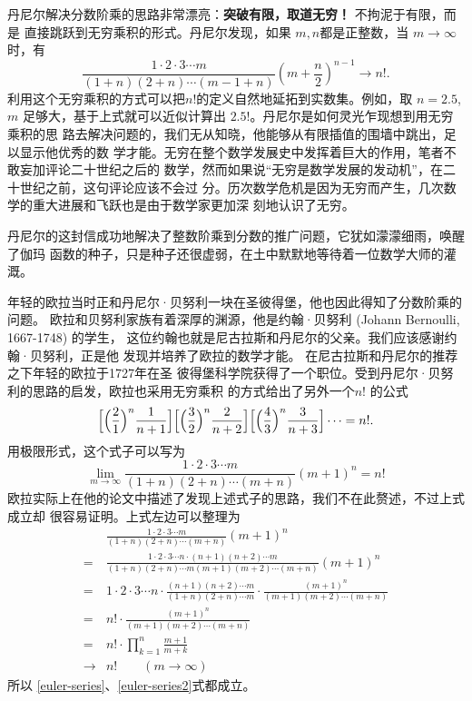 {丹尼尔解决分数阶乘的思路非常漂亮：{\bf 突破有限，取道无穷！} 不拘泥于有限，而是
直接跳跃到无穷乘积的形式。丹尼尔发现，如果 $m,n$都是正整数，当 $m
\rightarrow \infty$时，有
$$ \frac{1\cdot 2\cdot 3 \cdots m}{(1+n)(2+n)\cdots (m-1+n)}(m+\frac{n}{2})^{n-1} 
\rightarrow n! .$$
利用这个无穷乘积的方式可以把$n!$的定义自然地延拓到实数集。例如，取 $n=2.5$, $m$
足够大，基于上式就可以近似计算出 $2.5!$。丹尼尔是如何灵光乍现想到用无穷乘积的思
路去解决问题的，我们无从知晓，他能够从有限插值的围墙中跳出，足以显示他优秀的数
学才能。无穷在整个数学发展史中发挥着巨大的作用，笔者不敢妄加评论二十世纪之后的
数学，然而如果说“无穷是数学发展的发动机”，在二十世纪之前，这句评论应该不会过
分。历次数学危机是因为无穷而产生，几次数学的重大进展和飞跃也是由于数学家更加深
刻地认识了无穷。 

丹尼尔的这封信成功地解决了整数阶乘到分数的推广问题，它犹如濛濛细雨，唤醒了伽玛
函数的种子，只是种子还很虚弱，在土中默默地等待着一位数学大师的灌溉。

年轻的欧拉当时正和丹尼尔·贝努利一块在圣彼得堡，他也因此得知了分数阶乘的问题。
欧拉和贝努利家族有着深厚的渊源，他是约翰·贝努利 (Johann Bernoulli, 1667-1748)
的学生， 这位约翰也就是尼古拉斯和丹尼尔的父亲。我们应该感谢约翰·贝努利，正是他
发现并培养了欧拉的数学才能。 在尼古拉斯和丹尼尔的推荐之下年轻的欧拉于1727年在圣
彼得堡科学院获得了一个职位。受到丹尼尔·贝努利的思路的启发，欧拉也采用无穷乘积
的方式给出了另外一个$n!$ 的公式
\begin{equation}
\label{euler-series}
\Bigl[\Bigl(\frac{2}{1}\Bigr)^n\frac{1}{n+1}\Bigr]
\Bigl[\Bigl(\frac{3}{2}\Bigr)^n\frac{2}{n+2}\Bigr]
\Bigl[\Bigl(\frac{4}{3}\Bigr)^n\frac{3}{n+3}\Bigr] \cdots = n! .
\end{equation}
用极限形式，这个式子可以写为
\begin{equation}
\label{euler-series2}
\lim_{m \rightarrow \infty} \frac{1\cdot 2\cdot 3 \cdots m}{(1+n)(2+n)\cdots (m+n)}(m+1)^{n} = n!
\end{equation}
欧拉实际上在他的论文中描述了发现上述式子的思路，我们不在此赘述，不过上式成立却
很容易证明。上式左边可以整理为
\begin{align*}
& \frac{1\cdot 2\cdot 3 \cdots m}{(1+n)(2+n)\cdots (m+n)}(m+1)^{n}  \\
= & \frac{1\cdot 2\cdot 3 \cdots n \cdot (n+1)(n+2) \cdots m}{(1+n)(2+n)\cdots m (m+1)(m+2)\cdots (m+n)}
     (m+1)^{n} \\
= & 1\cdot 2\cdot 3 \cdots n \cdot \frac{(n+1)(n+2) \cdots m}{(1+n)(2+n)\cdots m }
     \cdot \frac{(m+1)^{n}}{(m+1)(m+2)\cdots (m+n)} \\
= & n! \cdot \frac{(m+1)^{n}}{(m+1)(m+2)\cdots (m+n)} \\
= & n! \cdot \prod_{k=1}^{n} \frac{m+1}{m+k}  \\
\rightarrow & n! \qquad (m\rightarrow \infty)
\end{align*}
所以 \eqref{euler-series}、\eqref{euler-series2}式都成立。

}
